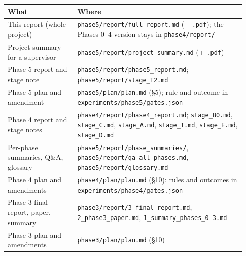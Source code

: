 \documentclass[11pt]{article}
\begin{document}
\begin{center}\small\begin{tabular}{>{\raggedright\arraybackslash}p{0.277\linewidth}>{\raggedright\arraybackslash}p{0.657\linewidth}}
\toprule
What & Where \\
\midrule
This report (whole project) & \texttt{phase5/\allowbreak{}report/\allowbreak{}full\_\allowbreak{}report.\allowbreak{}md} (+ \texttt{.pdf}); the Phases 0--4 version stays in \texttt{phase4/\allowbreak{}report/\allowbreak{}} \\
Project summary for a supervisor & \texttt{phase5/\allowbreak{}report/\allowbreak{}project\_\allowbreak{}summary.\allowbreak{}md} (+ \texttt{.pdf}) \\
Phase 5 report and stage note & \texttt{phase5/\allowbreak{}report/\allowbreak{}phase5\_\allowbreak{}report.\allowbreak{}md}; \texttt{phase5/\allowbreak{}report/\allowbreak{}stage\_\allowbreak{}T2.\allowbreak{}md} \\
Phase 5 plan and amendment & \texttt{phase5/\allowbreak{}plan/\allowbreak{}plan.\allowbreak{}md} (\S{}5); rule and outcome in \texttt{experiments/\allowbreak{}phase5/\allowbreak{}gates.\allowbreak{}json} \\
Phase 4 report and stage notes & \texttt{phase4/\allowbreak{}report/\allowbreak{}phase4\_\allowbreak{}report.\allowbreak{}md}; \texttt{stage\_B0.md}, \texttt{stage\_C.md}, \texttt{stage\_A.md}, \texttt{stage\_T.md}, \texttt{stage\_E.md}, \texttt{stage\_D.md} \\
Per-phase summaries, Q\&A, glossary & \texttt{phase5/\allowbreak{}report/\allowbreak{}phase\_\allowbreak{}summaries/\allowbreak{}}, \texttt{phase5/\allowbreak{}report/\allowbreak{}qa\_\allowbreak{}all\_\allowbreak{}phases.\allowbreak{}md}, \texttt{phase5/\allowbreak{}report/\allowbreak{}glossary.\allowbreak{}md} \\
Phase 4 plan and amendments & \texttt{phase4/\allowbreak{}plan/\allowbreak{}plan.\allowbreak{}md} (\S{}10); rules and outcomes in \texttt{experiments/\allowbreak{}phase4/\allowbreak{}gates.\allowbreak{}json} \\
Phase 3 final report, paper, summary & \texttt{phase3/\allowbreak{}report/\allowbreak{}3\_\allowbreak{}final\_\allowbreak{}report.\allowbreak{}md}, \texttt{2\_\allowbreak{}phase3\_\allowbreak{}paper.\allowbreak{}md}, \texttt{1\_\allowbreak{}summary\_\allowbreak{}phases\_\allowbreak{}0-3.\allowbreak{}md} \\
Phase 3 plan and amendments & \texttt{phase3/\allowbreak{}plan/\allowbreak{}plan.\allowbreak{}md} (\S{}10) \\

\end{tabular}
\end{center}
\end{document}
